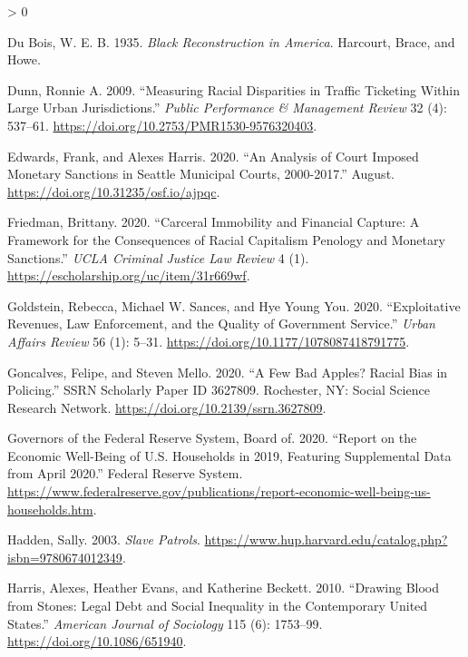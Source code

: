\documentclass[
  12pt,
]{article}
\newlength{\cslhangindent}
\newenvironment{CSLReferences}[2] %
 {%
  \setlength{\parindent}{0pt}
  \ifodd #1 \everypar{\setlength{\hangindent}{\cslhangindent}}\ignorespaces\fi
  \ifnum #2 > 0
  \setlength{\parskip}{#2\baselineskip}
  \fi
 }%
 {}
\begin{document}
\begin{CSLReferences}{1}{0}
\leavevmode\hypertarget{ref-DuBois1935}{}%
Du Bois, W. E. B. 1935. \emph{Black {Reconstruction} in {America}}. {Harcourt, Brace, and Howe}.

\leavevmode\hypertarget{ref-Dunn2009}{}%
Dunn, Ronnie A. 2009. {``Measuring {Racial Disparities} in {Traffic Ticketing Within Large Urban Jurisdictions}.''} \emph{Public Performance \& Management Review} 32 (4): 537--61. \url{https://doi.org/10.2753/PMR1530-9576320403}.

\leavevmode\hypertarget{ref-Edwards2020}{}%
Edwards, Frank, and Alexes Harris. 2020. {``An {Analysis} of {Court Imposed Monetary Sanctions} in {Seattle Municipal Courts}, 2000-2017.''} August. \url{https://doi.org/10.31235/osf.io/ajpqc}.

\leavevmode\hypertarget{ref-Friedman2020}{}%
Friedman, Brittany. 2020. {``Carceral {Immobility} and {Financial Capture}: {A Framework} for the {Consequences} of {Racial Capitalism Penology} and {Monetary Sanctions}.''} \emph{UCLA Criminal Justice Law Review} 4 (1). \url{https://escholarship.org/uc/item/31r669wf}.

\leavevmode\hypertarget{ref-Goldstein2020}{}%
Goldstein, Rebecca, Michael W. Sances, and Hye Young You. 2020. {``Exploitative {Revenues}, {Law Enforcement}, and the {Quality} of {Government Service}.''} \emph{Urban Affairs Review} 56 (1): 5--31. \url{https://doi.org/10.1177/1078087418791775}.

\leavevmode\hypertarget{ref-Goncalves2020}{}%
Goncalves, Felipe, and Steven Mello. 2020. {``A {Few Bad Apples}? {Racial Bias} in {Policing}.''} SSRN Scholarly Paper ID 3627809. {Rochester, NY}: {Social Science Research Network}. \url{https://doi.org/10.2139/ssrn.3627809}.

\leavevmode\hypertarget{ref-BoardofGovernorsoftheFederalReserveSystem2020}{}%
Governors of the Federal Reserve System, Board of. 2020. {``Report on the {Economic Well}-{Being} of {U}.{S}. {Households} in 2019, {Featuring Supplemental Data} from {April} 2020.''} {Federal Reserve System}. \url{https://www.federalreserve.gov/publications/report-economic-well-being-us-households.htm}.

\leavevmode\hypertarget{ref-Hadden2003}{}%
Hadden, Sally. 2003. \emph{Slave {Patrols}}. \url{https://www.hup.harvard.edu/catalog.php?isbn=9780674012349}.

\leavevmode\hypertarget{ref-Harris2010}{}%
Harris, Alexes, Heather Evans, and Katherine Beckett. 2010. {``Drawing {Blood} from {Stones}: {Legal Debt} and {Social Inequality} in the {Contemporary United States}.''} \emph{American Journal of Sociology} 115 (6): 1753--99. \url{https://doi.org/10.1086/651940}.


\end{CSLReferences}
\end{document}
